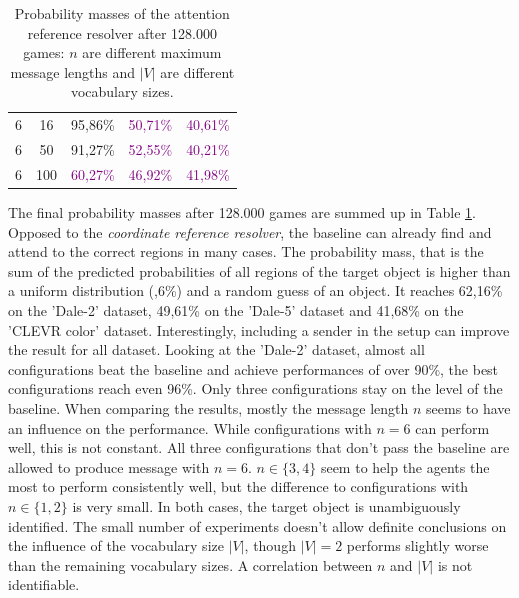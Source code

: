 \begin{table}[ht]
\begin{tabular}{cc|c|c|c}
        {6}                           & {16}      & {95,86\%}                           & \textcolor{purple}{50,71\%}         & \textcolor{purple}{40,61\%}              \\
        {6}                           & {50}      & {91,27\%}                           & \textcolor{purple}{52,55\%}         & \textcolor{purple}{40,21\%}              \\
        {6}                           & {100}     & \textcolor{purple}{60,27\%}         & \textcolor{purple}{46,92\%}         & \textcolor{purple}{41,98\%}              \\
        \bottomrule
    \end{tabular}
    \caption{Probability masses of the attention reference resolver after 128.000 games: $n$ are different maximum message lengths and $|V|$ are different vocabulary sizes.}
    \label{tab:results:attention-reference-resolver-game}
\end{table}

The final probability masses after 128.000 games are summed up in Table \ref{tab:results:attention-reference-resolver-game}.
Opposed to the \emph{coordinate reference resolver}, the baseline can already find and attend to the correct regions in many cases.
The probability mass, that is the sum of the predicted probabilities of all regions of the target object is higher than a uniform distribution (,6\%) and a random guess of an object.
It reaches 62,16\% on the 'Dale-2' dataset, 49,61\% on the 'Dale-5' dataset and 41,68\% on the 'CLEVR color' dataset.
Interestingly, including a sender in the setup can improve the result for all dataset.
Looking at the 'Dale-2' dataset, almost all configurations beat the baseline and achieve performances of over 90\%, the best configurations reach even 96\%.
Only three configurations stay on the level of the baseline.
When comparing the results, mostly the message length $n$ seems to have an influence on the performance.
While configurations with $n=6$ can perform well, this is not constant.
All three configurations that don't pass the baseline are allowed to produce message with $n=6$.
$n \in \{3,4\}$ seem to help the agents the most to perform consistently well, but the difference to configurations with $n \in \{1,2\}$ is very small.
In both cases, the target object is unambiguously identified.
The small number of experiments doesn't allow definite conclusions on the influence of the vocabulary size $|V|$, though $|V|=2$ performs slightly worse than the remaining vocabulary sizes.
A correlation between $n$ and $|V|$ is not identifiable.

